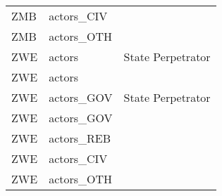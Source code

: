 \begin{table}[ht]
\begin{tabular}{lll}
  ZMB & actors\_CIV &  \\ 
  ZMB & actors\_OTH &  \\ 
  ZWE & actors & State Perpetrator \\ 
  ZWE & actors &  \\ 
  ZWE & actors\_GOV & State Perpetrator \\ 
  ZWE & actors\_GOV &  \\ 
  ZWE & actors\_REB &  \\ 
  ZWE & actors\_CIV &  \\ 
  ZWE & actors\_OTH &  \\ 
   \hline
\end{tabular}
\end{table}
